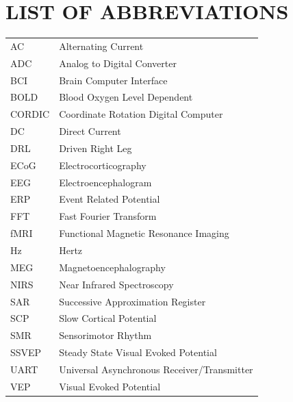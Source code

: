


\newpage
\section*{\centering LIST OF ABBREVIATIONS}

\begin{tabular}{p{3cm} p{10cm}}
	AC	  & Alternating Current \\
	ADC   & Analog to Digital Converter \\
	BCI   & Brain Computer Interface \\
	BOLD  & Blood Oxygen Level Dependent \\
	CORDIC& Coordinate Rotation Digital Computer \\
	DC	  & Direct Current \\
	DRL	  & Driven Right Leg\\
	ECoG  & Electrocorticography \\
	EEG   & Electroencephalogram \\
	ERP   & Event Related Potential \\
	FFT   & Fast Fourier Transform \\
	fMRI  & Functional Magnetic Resonance Imaging \\
	Hz    & Hertz \\
	MEG   & Magnetoencephalography \\
	NIRS  & Near Infrared Spectroscopy \\
	SAR   & Successive Approximation Register \\
	SCP   & Slow Cortical Potential \\
	SMR   & Sensorimotor Rhythm \\
	SSVEP & Steady State Visual Evoked Potential \\
	UART  & Universal Asynchronous Receiver/Transmitter\\
	VEP   & Visual Evoked Potential \\
\end{tabular}

